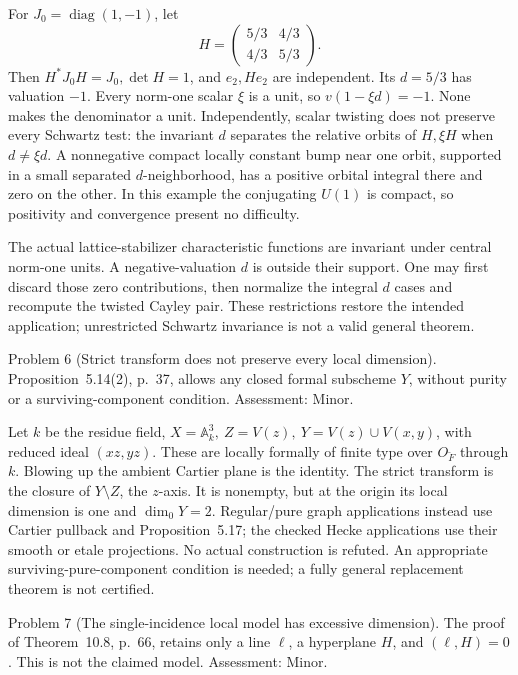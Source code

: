 \documentclass[10pt]{article}
\begin{document}
For \(J_0=\operatorname{diag}(1,-1)\), let \[H=\begin{pmatrix}5/3&4/3\\4/3&5/3\end{pmatrix}.\] Then \(H^*J_0H=J_0,\det H=1\), and \(e_2,He_2\) are independent. Its \(d=5/3\) has valuation \(-1\). Every norm-one scalar \(\xi\) is a unit, so \(v(1-\xi d)=-1\). None makes the denominator a unit. Independently, scalar twisting does not preserve every Schwartz test: the invariant \(d\) separates the relative orbits of \(H,\xi H\) when \(d\ne\xi d\). A nonnegative compact locally constant bump near one orbit, supported in a small separated \(d\)-neighborhood, has a positive orbital integral there and zero on the other. In this example the conjugating \(U(1)\) is compact, so positivity and convergence present no difficulty.\par
The actual lattice-stabilizer characteristic functions are invariant under central norm-one units. A negative-valuation \(d\) is outside their support. One may first discard those zero contributions, then normalize the integral \(d\) cases and recompute the twisted Cayley pair. These restrictions restore the intended application; unrestricted Schwartz invariance is not a valid general theorem.\par
Problem 6 (Strict transform does not preserve every local dimension).  Proposition 5.14(2), p. 37, allows any closed formal subscheme \(Y\), without purity or a surviving-component condition. Assessment: Minor.\par
Let \(k\) be the residue field, \(X=\mathbb A_k^3,\ Z=V(z),\ Y=V(z)\cup V(x,y)\), with reduced ideal \((xz,yz)\). These are locally formally of finite type over \(O_{\breve F}\) through \(k\). Blowing up the ambient Cartier plane is the identity. The strict transform is the closure of \(Y\setminus Z\), the \(z\)-axis. It is nonempty, but at the origin its local dimension is one and \(\dim_0Y=2\). Regular/pure graph applications instead use Cartier pullback and Proposition 5.17; the checked Hecke applications use their smooth or etale projections. No actual construction is refuted. An appropriate surviving-pure-component condition is needed; a fully general replacement theorem is not certified.\par
Problem 7 (The single-incidence local model has excessive dimension).  The proof of Theorem 10.8, p. 66, retains only a line \(\ell\), a hyperplane \(H\), and \((\ell,H)=0\). This is not the claimed model. Assessment: Minor.\par
\end{document}
